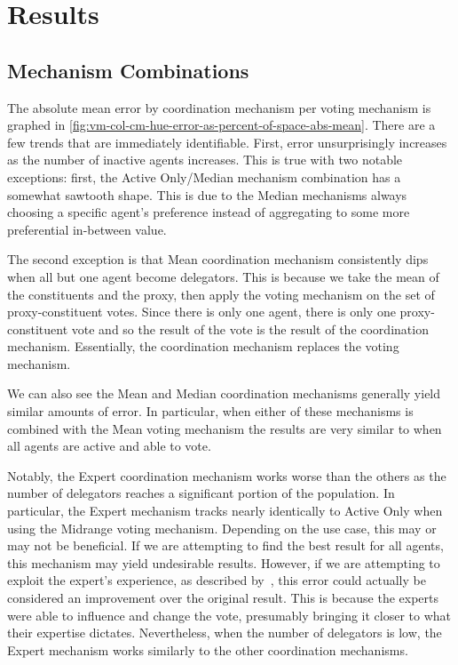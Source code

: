 \section{Results}\label{sec:results}

\subsection{Mechanism Combinations}\label{subsec:mechanism-combinations}
The absolute mean error by coordination mechanism per voting mechanism is graphed in
\autoref{fig:vm-col-cm-hue-error-as-percent-of-space-abs-mean}.
There are a few trends that are immediately identifiable.
First, error unsurprisingly increases as the number of inactive agents increases.
This is true with two notable exceptions: first, the Active Only/Median
mechanism combination has a somewhat sawtooth shape.
This is due to the Median mechanisms always choosing a specific agent's preference
instead of aggregating to some more preferential in-between value.

The second exception is that Mean coordination mechanism consistently dips when all but
one agent become delegators.
This is because we take the mean of the constituents and the proxy, then apply the
voting mechanism on the set of proxy-constituent votes.
Since there is only one agent, there is only one proxy-constituent vote and so the
result of the vote is the result of the coordination mechanism.
Essentially, the coordination mechanism replaces the voting mechanism.

We can also see the Mean and Median coordination mechanisms generally yield similar
amounts of error.
In particular, when either of these mechanisms is combined with the Mean voting
mechanism the results are very similar to when all agents are active and able to vote.

Notably, the Expert coordination mechanism works worse than the others as the number
of delegators reaches a significant portion of the population.
In particular, the Expert mechanism tracks nearly identically to Active Only when
using the Midrange voting mechanism.
Depending on the use case, this may or may not be beneficial.
If we are attempting to find the best result for all agents, this mechanism may yield
undesirable results.
However, if we are attempting to exploit the expert's experience, as described
by~\cite{Miller1969}, this error could actually be considered an improvement over
the original result.
This is because the experts were able to influence and change the vote, presumably
bringing it closer to what their expertise dictates.
Nevertheless, when the number of delegators is low, the Expert mechanism works
similarly to the other coordination mechanisms.

